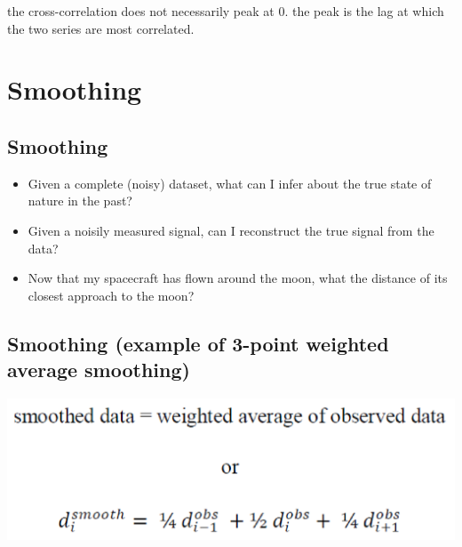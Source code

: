 \documentclass[11pt]{article}
\theoremstyle{definition}
\begin{document}
the cross-correlation does not necessarily peak at 0. the peak is the lag at which the two series are most correlated.

\section{Smoothing}
\subsection{Smoothing}
\begin{itemize}
  \item Given a complete (noisy) dataset, what can I infer about the
  true state of nature in the past?
  \item Given a noisily measured signal, can I reconstruct the true
  signal from the data?
  \item Now that my spacecraft has flown around the moon, what the
  distance of its closest approach to the moon?
\end{itemize}

\subsection{Smoothing
(example of 3-point weighted average smoothing)}
\includegraphics[width = \textwidth]{14.png}
\end{document}
